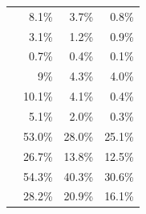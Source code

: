\begin{table}[!tbp]
\begin{tabular}{lrrr}
\eeTo{ \Pquark \Pquark} &  8.1\% &3.7\% & 0.8\%\\
\eeTo{ \Pquark \Pquark \Plepton \Pnu} & 3.1\% & 1.2\% & 0.9\%\\
\eeTo{ \Pquark \Pquark \Pl \Pl} &  0.7\% &0.4\% & 0.1\%\\
\eeTo{ \Pquark \Pquark \Pnu \Pnu} & 9\% & 4.3\% & 4.0\%\\
\hline
\egamma{\Pepm}{\Pphoton}{\BS}{\Pepm \Pquark \Pquark \Pquark \Pquark} & 10.1\% & 4.1\%  & 0.4\%\\
\egamma{\Pepm}{\Pphoton}{\EPA}{\Pepm \Pquark \Pquark \Pquark \Pquark} & 5.1\% & 2.0\% & 0.3\%\\
\egamma{\Pepm}{\Pphoton}{\BS}{\Pnu \Pquark \Pquark \Pquark \Pquark}& 53.0\%  & 28.0\% & 25.1\%\\
\egamma{\Pem}{\Pphoton}{\EPA}{\Pnu \Pquark \Pquark \Pquark \Pquark}& 26.7\% & 13.8\% & 12.5\% \\
\egamma{\Pepm}{\Pphoton}{\BS}{\Pquark \Pquark \PHiggs \Pnu} & 54.3\% & 40.3\%  & 30.6\% \\
\egamma{\Pem}{\Pphoton}{\EPA}{\Pquark \Pquark \PHiggs \Pnu} & 28.2\% & 20.9\% & 16.1\%  \\

\end{tabular}
\end{table}
